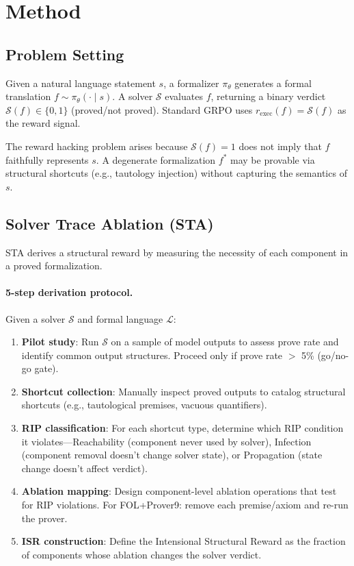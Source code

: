\documentclass[11pt,a4paper]{article}
\begin{document}
\section{Method}

\subsection{Problem Setting}

Given a natural language statement $s$, a formalizer $\pi_\theta$ generates a formal translation $f \sim \pi_\theta(\cdot \mid s)$.
A solver $\mathcal{S}$ evaluates $f$, returning a binary verdict $\mathcal{S}(f) \in \{0, 1\}$ (proved/not proved).
Standard GRPO uses $r_{\text{exec}}(f) = \mathcal{S}(f)$ as the reward signal.

The reward hacking problem arises because $\mathcal{S}(f) = 1$ does not imply that $f$ faithfully represents $s$.
A degenerate formalization $f^*$ may be provable via structural shortcuts (e.g., tautology injection) without capturing the semantics of $s$.

\subsection{Solver Trace Ablation (STA)}

STA derives a structural reward by measuring the necessity of each component in a proved formalization.

\paragraph{5-step derivation protocol.}
Given a solver $\mathcal{S}$ and formal language $\mathcal{L}$:
\begin{enumerate}
    \item \textbf{Pilot study}: Run $\mathcal{S}$ on a sample of model outputs to assess prove rate and identify common output structures. Proceed only if prove rate $>$ 5\% (go/no-go gate).
    \item \textbf{Shortcut collection}: Manually inspect proved outputs to catalog structural shortcuts (e.g., tautological premises, vacuous quantifiers).
    \item \textbf{RIP classification}: For each shortcut type, determine which RIP condition it violates---Reachability (component never used by solver), Infection (component removal doesn't change solver state), or Propagation (state change doesn't affect verdict).
    \item \textbf{Ablation mapping}: Design component-level ablation operations that test for RIP violations. For FOL+Prover9: remove each premise/axiom and re-run the prover.
    \item \textbf{ISR construction}: Define the Intensional Structural Reward as the fraction of components whose ablation changes the solver verdict.
\end{enumerate}
\end{document}

